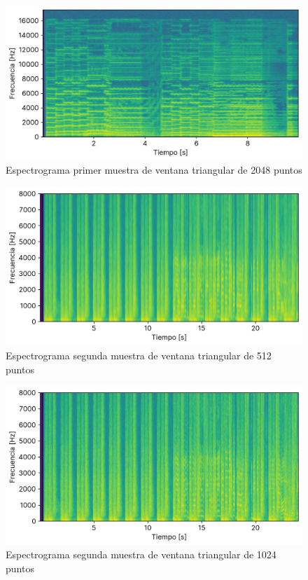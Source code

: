 \documentclass[12pt]{article}
\begin{document}
\begin{figure}[H]
\centering
\includegraphics{plot/cancion1_espectograma_bartlett_2048.png}
\caption{Espectrograma primer muestra de ventana triangular de 2048 puntos}
\label{cancion1_espectograma_bartlett_2048}
\end{figure}

\begin{figure}[H]
\centering
\includegraphics{plot/cancion2_espectograma_bartlett_0512.png}
\caption{Espectrograma segunda muestra de ventana triangular de 512 puntos}
\label{cancion2_espectograma_bartlett_0512}
\end{figure}

\begin{figure}[H]
\centering
\includegraphics{plot/cancion2_espectograma_bartlett_1024.png}
\caption{Espectrograma segunda muestra de ventana triangular de 1024 puntos}
\label{cancion2_espectograma_bartlett_1024}
\end{figure}
\end{document}

